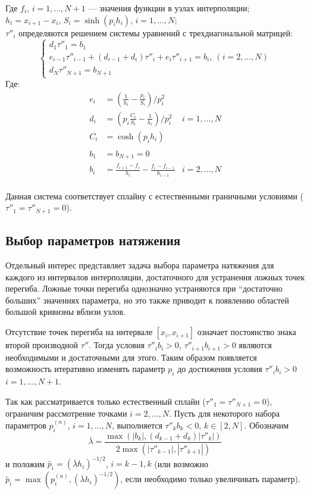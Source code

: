 Где $f_i$, $i = 1, \ldots, N+1$ --- значения функции в узлах интерполяции;\\
$h_i = x_{i+1} - x_i$,  $S_i = \sinh(p_i h_i)$, $i = 1, \ldots, N$;\\
$\tau''_i$ определяются решением системы уравнений с трехдиагональной матрицей:
$$
\begin{cases}
d_1 \tau''_1 = b_1 \\
e_{i-1} \tau''_{i-1} + (d_{i-1} + d_i)\tau''_i + e_i \tau''_{i+1} = b_i,\ (i = 2, \ldots, N) \\
d_N \tau''_{N+1} = b_{N+1}
\end{cases}
$$
Где:
\begin{align*} 
e_i &= \left(\frac{1}{h_i} - \frac{p_i}{S_i}\right) /p^2_i & \\
d_i &= \left(p_i \frac{C_i}{S_i} - \frac{1}{h_i}\right)/p^2_i & i = 1, \ldots, N\\
C_i &= \cosh(p_i h_i) & \\
\\
b_1 &= b_{N+1} = 0 & \\
b_i &= \frac{f_{i+1} - f_i}{h_i} - \frac{f_i - f_{i-1}}{h_{i-1}} & i = 2, \ldots, N \\
\end{align*} 

Данная система соответствует сплайну с естественными граничными условиями ($\tau''_1 = \tau''_{N+1} = 0$).

\subsection*{Выбор параметров натяжения}

Отдельный интерес представляет задача выбора параметра натяжения для каждого из интервалов интерполяции, достаточного для устранения ложных точек перегиба.
Ложные точки перегиба однозначно устраняются при \enquote{достаточно больших} значениях параметра, но это также приводит к появлению областей большой кривизны вблизи узлов.

Отсутствие точек перегиба на интервале $[x_i, x_{i+1}]$ означает постоянство знака второй производной $\tau''$. Тогда условия $\tau''_ib_i > 0$, $\tau''_{i+1}b_{i+1} > 0$ являются необходимыми и достаточными для этого. Таким образом появляется возможность итеративно изменять параметр $p_i$ до достижения условия $\tau''_ib_i > 0$ $i = 1, \ldots, N+1$.

Так как рассматривается только естественный сплайн ($\tau''_1 = \tau''_{N+1} = 0$), ограничим рассмотрение точками $i = 2, \ldots, N$. Пусть для некоторого набора параметров $p^{(n)}_i$, $i = 1, \ldots, N$, выполняется $\tau''_kb_k < 0$, $k \in [2, N]$. 
Обозначим $$\overline{\lambda} = \frac{\max(|b_k|, (d_{k-1} + d_k) |\tau''_k|)}{2 \max(|\tau''_{k-1}|, |\tau''_{k+1}|)}$$
и положим $\tilde{p_i} = (\overline{\lambda} h_i)^{-1/2}$, $i = k-1, k$ (или возможно $\tilde{p_i} = \max(p^{(n)}_i, (\overline{\lambda} h_i)^{-1/2})$, если необходимо только увеличивать параметр).

